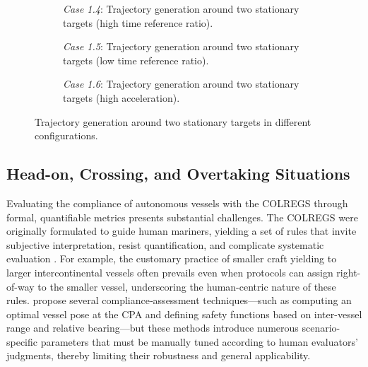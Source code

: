 \begin{figure}
    \centering
    \begin{subfigure}[b]{\textwidth}
        \centering
        
        \caption{\emph{Case 1.4}: Trajectory generation around two stationary targets (high time reference ratio).}
        \label{fig:stationary-target-5}
    \end{subfigure}
    \hfill
    \begin{subfigure}[b]{\textwidth}
        \centering
        
        \caption{\emph{Case 1.5}: Trajectory generation around two stationary targets (low time reference ratio).}
        \label{fig:stationary-target-6}
    \end{subfigure}
    \hfill
    \begin{subfigure}[b]{\textwidth}
        \centering
        
        \caption{\emph{Case 1.6}: Trajectory generation around two stationary targets (high acceleration).}
        \label{fig:stationary-target-7}
    \end{subfigure}
    \caption{Trajectory generation around two stationary targets in different configurations.}
    \label{fig:stationary-targets-subfigures-2}
\end{figure}


\FloatBarrier
\subsection{Head-on, Crossing, and Overtaking Situations}
\label{sec:case-2-head-on}


Evaluating the compliance of autonomous vessels with the COLREGS through formal, quantifiable metrics presents substantial challenges. The COLREGS were originally formulated to guide human mariners, yielding a set of rules that invite subjective interpretation, resist quantification, and complicate systematic evaluation \citep{Woerner2018}.  For example, the customary practice of smaller craft yielding to larger intercontinental vessels often prevails even when protocols can assign right-of-way to the smaller vessel, underscoring the human-centric nature of these rules. \citet{Woerner2018} propose several compliance‐assessment techniques---such as computing an optimal vessel pose at the \acrshort{CPA} and defining safety functions based on inter-vessel range and relative bearing---but these methods introduce numerous scenario-specific parameters that must be manually tuned according to human evaluators' judgments, thereby limiting their robustness and general applicability.



